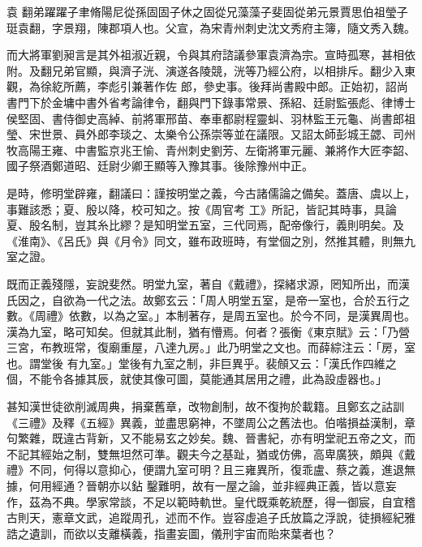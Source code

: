 
\begin{pinyinscope}

 袁
 翻弟躍躍子聿脩陽尼從孫固固子休之固從兄藻藻子斐固從弟元景賈思伯祖瑩子珽袁翻，字景翔，陳郡項人也。父宣，為宋青州刺史沈文秀府主簿，隨文秀入魏。



 而大將軍劉昶言是其外祖淑近親，令與其府諮議參軍袁濟為宗。宣時孤寒，甚相依附。及翻兄弟官顯，與濟子洸、演遂各陵競，洸等乃經公府，以相排斥。翻少入東觀，為徐紇所薦，李彪引兼著作佐
 郎，參史事。後拜尚書殿中郎。正始初，詔尚書門下於金墉中書外省考論律令，翻與門下錄事常景、孫紹、廷尉監張彪、律博士侯堅固、書侍御史高綽、前將軍邢苗、奉車都尉程靈虯、羽林監王元龜、尚書郎祖瑩、宋世景、員外郎李琰之、太樂令公孫崇等並在議限。又詔太師彭城王勰、司州牧高陽王雍、中書監京兆王愉、青州刺史劉芳、左衛將軍元麗、兼將作大匠李韶、國子祭酒鄭道昭、廷尉少卿王顯等入豫其事。後除豫州中正。



 是時，修明堂辟雍，翻議曰：謹按明堂之義，今古諸儒論之備矣。蓋唐、虞以上，事難該悉；夏、殷以降，校可知之。按《周官考
 工》所記，皆記其時事，具論夏、殷名制，豈其糸比繆？是知明堂五室，三代同焉，配帝像行，義則明矣。及《淮南》、《呂氏》與《月令》同文，雖布政班時，有堂個之別，然推其體，則無九室之證。



 既而正義殘隱，妄說斐然。明堂九室，著自《戴禮》，探緒求源，罔知所出，而漢氏因之，自欲為一代之法。故鄭玄云：「周人明堂五室，是帝一室也，合於五行之數。《周禮》依數，以為之室。」本制著存，是周五室也。於今不同，是漢異周也。漢為九室，略可知矣。但就其此制，猶有懵焉。何者？張衡《東京賦》云：「乃營三宮，布教班常，復廟重屋，八達九房。」此乃明堂之文也。而薛綜注云：「房，室也。謂堂後
 有九室。」堂後有九室之制，非巨異乎。裴頠又云：「漢氏作四維之個，不能令各據其辰，就使其像可圖，莫能通其居用之禮，此為設虛器也。」



 甚知漢世徒欲削滅周典，捐棄舊章，改物創制，故不復拘於載籍。且鄭玄之詁訓《三禮》及釋《五經》異義，並盡思窮神，不墜周公之舊法也。伯喈損益漢制，章句繁雜，既違古背新，又不能易玄之妙矣。魏、晉書紀，亦有明堂祀五帝之文，而不記其經始之制，雙無坦然可準。觀夫今之基趾，猶或仿佛，高卑廣狹，頗與《戴禮》不同，何得以意抑心，便謂九室可明？且三雍異所，復乖盧、蔡之義，進退無據，何用經通？晉朝亦以鉆
 鑿難明，故有一屋之論，並非經典正義，皆以意妄作，茲為不典。學家常談，不足以範時軌世。皇代既乘乾統歷，得一御宸，自宜稽古則天，憲章文武，追蹤周孔，述而不作。豈容虛追子氏放篇之浮說，徒損經紀雅誥之遺訓，而欲以支離橫義，指畫妄圖，儀刑宇宙而貽來葉者也？




\end{pinyinscope}
